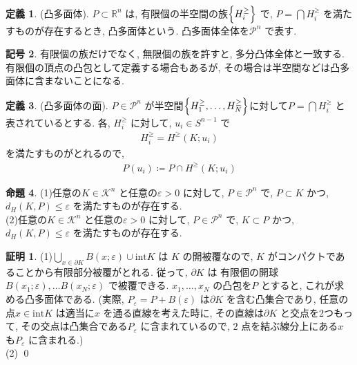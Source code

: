 \documentclass[10pt, fleqn, label-section=none]{bxjsarticle}
\theoremstyle{definition}
\newtheorem{dfn}{定義}[section]
\newtheorem{prop}[dfn]{命題}
\newtheorem{notation}[dfn]{記号}
\newtheorem*{pf*}{証明}
\newcommand{\veps}{\varepsilon}
\newcommand{\cbra}[1]{\mleft\{#1\mright\}}
\renewcommand{\;}{\, ; \,}
\begin{document}
\begin{dfn}(凸多面体). $P \subset \mathbb R^n$ は, 有限個の半空間の族$\cbra{H^{\geq}_i}$ で, $P = \bigcap H^{\geq}_i$ を満たすものが存在するとき, 凸多面体という. 凸多面体全体を$\mathcal P ^n$ で表す. 
\end{dfn}


\begin{notation}有限個の族だけでなく, 無限個の族を許すと, 多分凸体全体と一致する. 有限個の頂点の凸包として定義する場合もあるが, その場合は半空間などは凸多面体に含まないことになる. 

\end{notation}

\begin{dfn}(凸多面体の面). $P \in \mathcal P^n$ が半空間$\cbra{H^\geq _1, \ldots, H^\geq _N}$に対して$P = \bigcap H^{\geq}_i$ と表されているとする. 各, $H^\geq_i$ に対して, $u_i \in S^{n-1}$ で
\begin{align*} H^\geq_i =  H^{\geq} (K; u_i) \end{align*}
を満たすものがとれるので, 
\begin{align*} P(u_i) \coloneqq P \cap H^{\geq} (K; u_i) \end{align*}
\end{dfn}



\begin{prop}
(1)任意の$K \in \mathcal K ^n$ と任意の$\veps > 0$ に対して, $P \in \mathcal P^n$ で, $P \subset K$ かつ, $d_H(K, P) \leq \veps$ を満たすものが存在する. \\
(2)任意の$K \in \mathcal K ^n$ と任意の$\veps > 0$ に対して, $P \in \mathcal P^n$ で, $K \subset P$ かつ, $d_H(K, P) \leq \veps$ を満たすものが存在する. 
\end{prop}
\begin{pf*}
(1)$\bigcup_{x \in \partial K} B(x; \veps) \cup \textrm{int} K$ は $K$ の開被覆なので, $K$ がコンパクトであることから有限部分被覆がとれる. 従って, $\partial K$ は 有限個の開球$B(x_1; \veps), \ldots B(x_N; \veps)$ で被覆できる. $x_1, \ldots , x_N$ の凸包を$P$ とすると, これが求める凸多面体である. (実際, $P_\veps = P + B(\veps)$ は$\partial K$ を含む凸集合であり, 任意の点$x \in \textrm{int} K$ は適当に$x$ を通る直線を考えた時に, その直線は$\partial K$ と交点を2つもって, その交点は凸集合である$P_\veps$ に含まれているので, $2$ 点を結ぶ線分上にある$x$ も$P_\veps$ に含まれる.) \\
(2)
\qed
\end{pf*}
\end{document}
